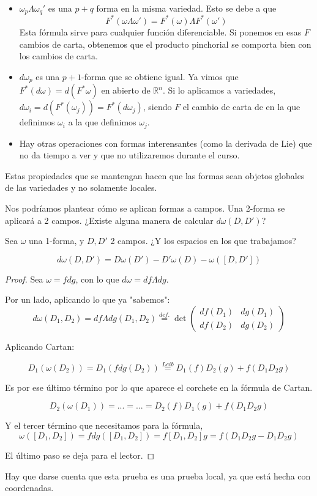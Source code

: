 \begin{itemize}
\item $ω_pΛω_q'$ es una $p+q$ forma en la misma variedad. Esto se debe a que \[F^*(ωΛω') = F^*(ω) Λ F^*(ω')\]
Esta fórmula sirve para cualquier función diferenciable. Si ponemos en esas $F$ cambios de carta, obtenemos que el producto pinchorial se comporta bien con los cambios de carta.

\item $dω_p$ es una $p+1$-forma que se obtiene igual. Ya vimos que $F^*(dω) = d(F^*ω)$ en abierto de $ℝ^n$. Si lo aplicamos a variedades, $dω_i = d(F^*(ω_j)) = F^*(dω_j)$, siendo $F$ el cambio de carta de en la que definimos $ω_i$ a la que definimos $ω_j$.
\item Hay otras operaciones con formas interensantes (como la derivada de Lie) que no da tiempo a ver y que no utilizaremos durante el curso.
\end{itemize}

Estas propiedades que se mantengan hacen que las formas sean objetos globales de las variedades y no solamente locales.

Nos podríamos plantear cómo se aplican formas a campos. Una 2-forma se aplicará a 2 campos. ¿Existe alguna manera de calcular $dω(D,D')$?

\begin{theorem}
Sea $ω$ una 1-forma, y $D,D'$ 2 campos. ¿Y los espacios en los que trabajamos?

\[dω(D,D') = Dω(D') - D'ω(D) - ω([D,D'])\]

\end{theorem}


\begin{proof}
	Sea $ω = f dg$, con lo que $dω = df Λ dg$.
	
	Por un lado, aplicando lo que ya "sabemos":
	\[dω(D_1,D_2) = df Λ dg(D_1,D_2) \overset{def.}{=} \det\begin{pmatrix}
	df(D_1) & dg(D_1)\\
	df(D_2) & dg(D_2)
	\end{pmatrix}
	\]
	
	Aplicando Cartan:
	
	\[
	D_1(ω(D_2)) = D_1(fdg(D_2)) \overset{Leib}{=} D_1(f) D_2(g) + f(D_1D_2g) 
	\]
	
	Es por ese último término por lo que aparece el corchete en la fórmula de Cartan.
	
	\[D_2(ω(D_1)) = ... = ... = D_2(f)D_1(g) + f(D_1D_2g)	\]
	
	Y el tercer término que necesitamos para la fórmula,
	\[ω([D_1,D_2]) =fdg([D_1,D_2]) =f[D_1,D_2]g = f(D_1D_2g - D_1D_2g)	\]
	
	El último paso se deja para el lector.
	
\end{proof}
Hay que darse cuenta que esta prueba es una prueba local, ya que está hecha con coordenadas.


